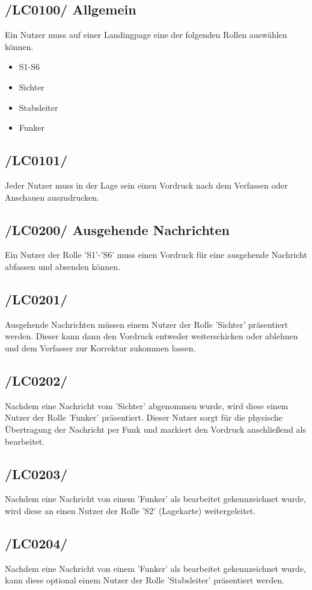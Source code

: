 \subsection{/LC0100/ Allgemein}
Ein Nutzer muss auf einer Landingpage eine der folgenden Rollen auswählen können.
\begin{itemize}
\item S1-S6
\item Sichter
\item Stabsleiter
\item Funker
\end{itemize}

\subsection{/LC0101/}
Jeder Nutzer muss in der Lage sein einen Vordruck nach dem Verfassen oder Anschauen auszudrucken.

\subsection{/LC0200/ Ausgehende Nachrichten} 
Ein Nutzer der Rolle 'S1'-'S6' muss einen Vordruck für eine ausgehende Nachricht abfassen und absenden können.

\subsection{/LC0201/}
Ausgehende Nachrichten müssen einem Nutzer der Rolle 'Sichter' präsentiert werden. Dieser kann dann den Vordruck entweder weiterschicken oder ablehnen und dem Verfasser zur Korrektur zukommen lassen.

\subsection{/LC0202/}
Nachdem eine Nachricht vom 'Sichter' abgenommen wurde, wird diese einem Nutzer der Rolle 'Funker' präsentiert. Dieser Nutzer sorgt für die physische Übertragung der Nachricht per Funk und markiert den Vordruck anschließend als bearbeitet.

\subsection{/LC0203/}
Nachdem eine Nachricht von einem 'Funker' als bearbeitet gekennzeichnet wurde, wird diese an einen Nutzer der Rolle 'S2' (Lagekarte) weitergeleitet.

\subsection{/LC0204/}
Nachdem eine Nachricht von einem 'Funker' als bearbeitet gekennzeichnet wurde, kann diese optional einem Nutzer der Rolle 'Stabsleiter' präsentiert werden.

